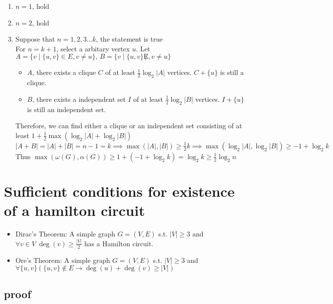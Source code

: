 \documentclass{article}
\begin{document}
\begin{enumerate}
	\item $n=1$, hold
	\item $n=2$, hold
	\item Suppose that $n=1,2,3\ldots k$, the statement is true\\
		For $n=k+1$, select a arbitary vertex $u$. 
		Let $A=\{v\mid \{u,v\}\in E,v\neq u\},\, B=\{v\mid \{u,v\}\not E,v\neq u\}$\\
		\begin{itemize}
			\item $A$, there exists a clique $C$ of at least $\frac{1}{2}\log_2 |A|$ vertices.
				$C+\{u\}$ is still a clique.
			\item $B$, there exists a independent set $I$ of at least $\frac{1}{2}\log_2 |B|$ vertices.
				$I+\{u\}$ is still an independent set.
		\end{itemize}
		Therefore, we can find either a clique or an independent set consisting of at least $1+\frac{1}{2}\max\left(\log_2 |A|+\log_2 |B|\right)$\\
		$|A+B|=|A|+|B|=n-1=k\implies \max(|A|,|B|)\geq \frac{1}{2}k\implies \max\left(\log_2 |A|,\log_2 |B|\right)\geq -1+\log_2 k$\\
		Thus $\max(\omega(G),\alpha(G))\geq 1+\left(-1+\log_2 k\right)=\log_2 k\geq \frac{1}{2}\log_2 n$
\end{enumerate}


\newpage
\section{Sufficient conditions for existence of a hamilton circuit }

\begin{itemize}
	\item Dirac's Theorem:
		A simple graph $G=(V,E)$ s.t. $|V|\geq 3$ and $\forall v\in V\ \deg(v)\geq \frac{|V|}{2}$ has a Hamilton circuit.
	\item Ore's Theorem: 
		A simple graph $G=(V,E)$ s.t. $|V|\geq 3$ and $\forall \{u,v\}\left( \{u,v\}\not\in E\rightarrow \deg(u)+\deg(v)\geq |V|\right)$
\end{itemize}

\subsection{proof}
\end{document}

